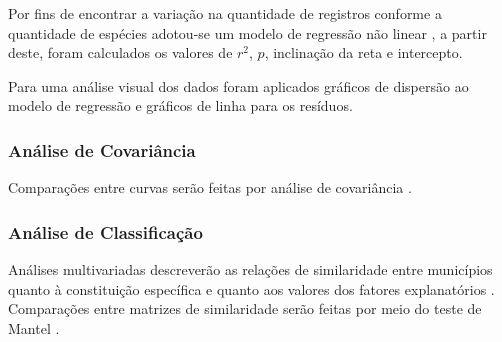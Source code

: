 Por fins de encontrar a variação na quantidade de registros conforme a quantidade de espécies adotou-se um modelo de regressão não linear \cite{NicholasJ.Gotelli;AaronM.Ellison2010}, a partir deste, foram calculados os valores de $r^2$, $p$, inclinação da reta e intercepto.

Para uma análise visual dos dados foram aplicados gráficos de dispersão ao modelo de regressão \cite{NicholasJ.Gotelli;AaronM.Ellison2010} e gráficos de linha para os resíduos.

\subsubsection{Análise de Covariância}

Comparações entre curvas serão feitas por análise de covariância \cite{NicholasJ.Gotelli;AaronM.Ellison2010,Borcard2011, Field2012}.

\subsubsection{Análise de Classificação}

Análises multivariadas descreverão as relações de similaridade entre municípios quanto à constituição específica e quanto aos valores dos fatores explanatórios \cite{NicholasJ.Gotelli;AaronM.Ellison2010,Borcard2011,VALENTIN2000,greenacre2014multivariate}. Comparações entre matrizes de similaridade serão feitas por meio do teste de Mantel \cite{Borcard2011,VALENTIN2000}. 
